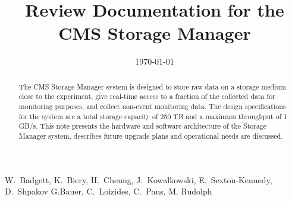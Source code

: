 \documentclass{cmspaper}
\begin{document}

\begin{titlepage}

   \date{\today}

  \title{Review Documentation for the\\ CMS Storage Manager}

  \begin{Authlist}
    W.~Badgett, K.~Biery, H.~Cheung, J.~Kowalkowski, 
    E.~Sexton-Kennedy, D.~Shpakov
    G.Bauer, C.~Loizides, C.~Paus, M. Rudolph 
  \end{Authlist}



  \begin{abstract}
The CMS Storage Manager system is designed to store raw data on a storage medium close to the
experiment, give real-time access to a fraction of the collected data for monitoring purposes, and
collect non-event monitoring data. The design specifications for the system are a total storage capacity
of 250 TB and a maximum throughput of 1 GB/s. This note presents the hardware and software
architecture of  the Storage Manager system, describes future upgrade plans and operational 
needs are discussed. 
  \end{abstract} 

  
\end{titlepage}

\setcounter{page}{2}%






\end{document}
